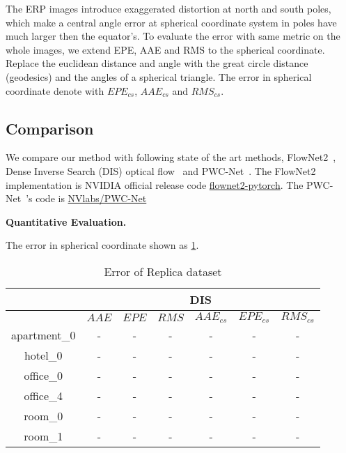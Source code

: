 The ERP images introduce exaggerated distortion at north and south poles, which make a central angle error at spherical coordinate system in poles have much larger then the equator's.
To evaluate the error with same metric on the whole images, we extend EPE, AAE and RMS to the spherical coordinate. 
Replace the euclidean distance and angle with the great circle distance (geodesics) and the angles of a spherical triangle. 
The error in spherical coordinate denote with $EPE_{cs}$, $AAE_{cs}$ and $RMS_{cs}$.

\subsection{Comparison}

We compare our method with following state of the art methods, FlowNet2~\cite{IlgMSKDB2017}, Dense Inverse Search (DIS) optical flow~\cite{KroegTDV2016} and PWC-Net~\cite{SunYLK2018}. 
The FlowNet2~\cite{IlgMSKDB2017} implementation is NVIDIA official release code \href{https://github.com/NVIDIA/flownet2-pytorch}{flownet2-pytorch}.
The PWC-Net~\cite{SunYLK2018}'s code is \href{https://github.com/NVlabs/PWC-Net}{NVlabs/PWC-Net}


\textbf{Quantitative Evaluation.}


The error in spherical coordinate shown as \cref{fig:exp:quality}.



\begin{table}[h!]
	\centering
	\caption{\label{fig:exp:quality}%
		Error of Replica dataset}
	\begin{tabular}{ c | c | c | c | c | c | c }
		\hline
		& \multicolumn{6}{c}{DIS}  \\
		\hline
		& ${AAE}$ & ${EPE}$ & ${RMS}$ & ${AAE_{cs}}$ & ${EPE_{cs}}$ & ${RMS_{cs}}$ \\
		\hline
		apartment\_0 & - & - & -  & - & - & -  \\ 
		\hline
		hotel\_0 & - & - & -  & - & - & -  \\ 
		\hline
		office\_0 & - & - & - & - & - & -  \\ 
		\hline
		office\_4 & - & - & -  & - & - & -  \\ 
		\hline
		room\_0 & - & - & - & - & - & -  \\ 
		\hline
		room\_1 & - & - & -  & - & - & -  \\ 
		\hline\hline
	\end{tabular}
\end{table}


